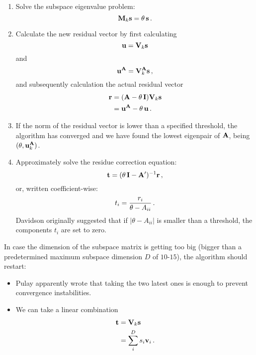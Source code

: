 \begin{enumerate}
            \item Solve the subspace eigenvalue problem:
                \begin{equation}
                    \vb{M}_k \vb{s} = \theta \thinspace \vb{s} \thinspace .
                \end{equation}

            \item Calculate the new residual vector by first calculating
                \begin{equation}
                    \vb{u} = \vb{V}_k \vb{s}
                \end{equation}
                and
                \begin{equation}
                    \vb{u}^{\vb{A}} = \vb{V}_k^{\vb{A}} \vb{s} \thinspace ,
                \end{equation}
                and subsequently calculation the actual residual vector
                \begin{align}
                    \vb{r} &= (\vb{A} - \theta \thinspace \vb{I}) \vb{V}_k \vb{s} \\
                    &= \vb{u}^{\vb{A}} - \theta \thinspace \vb{u} \thinspace .
                \end{align}

            \item If the norm of the residual vector is lower than a specified threshold, the algorithm has converged and we have found the lowest eigenpair of $\vb{A}$, being $(\theta, \vb{u}_k^{\vb{A}})$.

            \item Approximately solve the residue correction equation:
                \begin{equation}
                    \vb{t} = (\theta \thinspace \vb{I} - \vb{A}')^{-1} \vb{r} \thinspace ,
                \end{equation}
                or, written coefficient-wise:
                \begin{equation}
                    t_i = \frac{r_i}{\theta - A_{ii}} \thinspace .
                \end{equation}
                Davidson originally suggested that if $|\theta - A_{ii}|$ is smaller than a threshold, the components $t_i$ are set to zero.
        \end{enumerate}

        In case the dimension of the subspace matrix is getting too big (bigger than a predetermined maximum subspace dimension $D$ of $10$-$15$), the algorithm should restart:
        \begin{itemize}
            \item Pulay apparently wrote that taking the two latest ones is enough to prevent convergence instabilities.
            \item We can take a linear combination
                \begin{align}
                    \vb{t} &= \vb{V}_k \vb{s}  \\
                    &= \sum_i^D s_i \vb{v}_i \thinspace .
                \end{align}
        \end{itemize}
